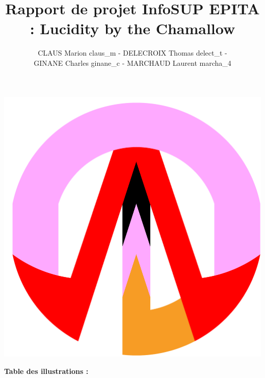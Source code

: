 \documentclass[a4paper , 12pt]{article}
\begin{document}
\begin{titlepage}
\begin{centering}
		\title{Rapport de projet InfoSUP EPITA : Lucidity by the Chamallow}
		 
		\author{CLAUS Marion claus\_m -  DELECROIX Thomas  delect\_t - \\GINANE Charles ginane\_c - 
 MARCHAUD Laurent marcha\_4} 

\end{centering}
\end{titlepage}
\pagestyle{fancy}
\renewcommand{\footrulewidth}{0.4pt}

  \begin{titlepage}
\centering
\maketitle

	\includegraphics[scale=0.1]{Logo.png}

  \end{titlepage}

\newpage

\tableofcontents

\newpage

\begin{flushleft}

\large

\textbf{Table des illustrations :}

\end{flushleft} 
\end{document}
